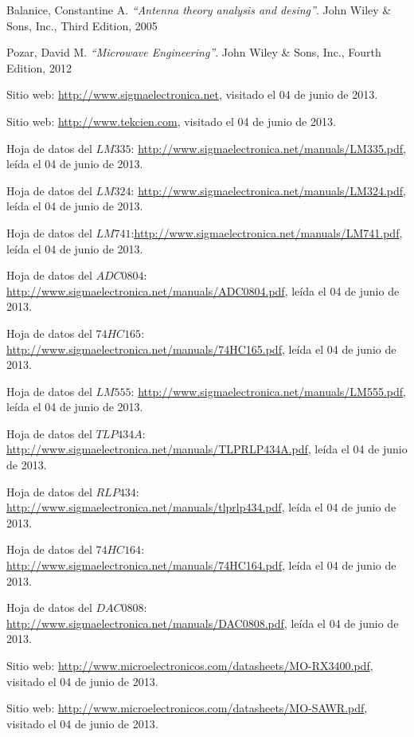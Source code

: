 \documentclass[twocolumn]{IEEEtran}
\begin{document}

\begin{thebibliography}{99}

 Balanice, Constantine A.
{\em ``Antenna theory analysis and desing''}.
John Wiley \& Sons, Inc., Third Edition, 2005

 Pozar, David M.
{\em ``Microwave Engineering''}.
John Wiley \& Sons, Inc., Fourth Edition, 2012

 Sitio web: \url{http://www.sigmaelectronica.net}, visitado el 04 de junio de 2013.

 Sitio web: \url{http://www.tekcien.com}, visitado el 04 de junio de 2013.

 Hoja de datos del $LM335$: \url{http://www.sigmaelectronica.net/manuals/LM335.pdf}, leída el 04 de junio de 2013.

 Hoja de datos del $LM324$: \url{http://www.sigmaelectronica.net/manuals/LM324.pdf}, leída el 04 de junio de 2013.

 Hoja de datos del $LM741$:\url{http://www.sigmaelectronica.net/manuals/LM741.pdf}, leída el 04 de junio de 2013.

 Hoja de datos del $ADC0804$: \url{http://www.sigmaelectronica.net/manuals/ADC0804.pdf}, leída el 04 de junio de 2013.

 Hoja de datos del $74HC165$: \url{http://www.sigmaelectronica.net/manuals/74HC165.pdf}, leída el 04 de junio de 2013.

 Hoja de datos del $LM555$: \url{http://www.sigmaelectronica.net/manuals/LM555.pdf}, leída el 04 de junio de 2013.

 Hoja de datos del $TLP434A$: \url{http://www.sigmaelectronica.net/manuals/TLPRLP434A.pdf}, leída el 04 de junio de 2013.

 Hoja de datos del $RLP434$: \url{http://www.sigmaelectronica.net/manuals/tlprlp434.pdf}, leída el 04 de junio de 2013.

 Hoja de datos del $74HC164$: \url{http://www.sigmaelectronica.net/manuals/74HC164.pdf}, leída el 04 de junio de 2013.

 Hoja de datos del $DAC0808$: \url{http://www.sigmaelectronica.net/manuals/DAC0808.pdf}, leída el 04 de junio de 2013.

 Sitio web: \url{http://www.microelectronicos.com/datasheets/MO-RX3400.pdf}, visitado el 04 de junio de 2013.

 Sitio web: \url{http://www.microelectronicos.com/datasheets/MO-SAWR.pdf}, visitado el 04 de junio de 2013.

\end{thebibliography}
\end{document}

